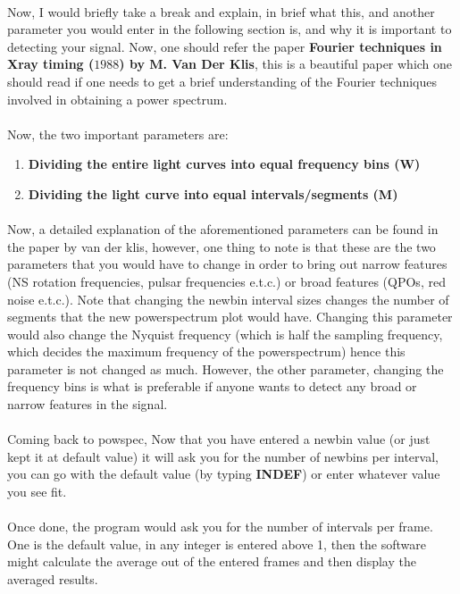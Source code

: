 \documentclass[a4paper,twoside]{report}
\numberwithin{equation}{section}
\begin{document}
\paragraph{}
Now, I would briefly take a break and explain, in brief what this, and another parameter you would enter in the following section is, and why it is important to detecting your signal. Now, one should refer the paper \textbf{Fourier techniques in Xray timing ($1988$) by M. Van Der Klis}, this is a beautiful paper which one should read if one needs to get a brief understanding of the Fourier techniques involved in obtaining a  power spectrum. 
\paragraph{}
Now, the two important parameters are:
\begin{enumerate}
\item \textbf{Dividing the entire light curves into equal frequency bins (W)}
\item \textbf{Dividing the light curve into equal intervals/segments (M)}
\end{enumerate}
\paragraph{}
Now, a detailed explanation of the aforementioned parameters can be found in the paper by van der klis, however, one thing to note is that these are the two parameters that you would have to change in order to bring out narrow features (NS rotation frequencies, pulsar frequencies e.t.c.) or broad features (QPOs, red noise e.t.c.). Note that changing the newbin interval sizes changes the number of segments that the new powerspectrum plot would have. Changing this parameter would also change the Nyquist frequency (which is half the sampling frequency, which decides the maximum frequency of the powerspectrum) hence this parameter is not changed as much. However, the other parameter, changing the frequency bins is what is preferable if anyone wants to detect any broad or narrow features in the signal.
\paragraph{}
Coming back to powspec, Now that you have entered a newbin value (or just kept it at default value) it will ask you for the number of newbins per interval, you can go with the default value (by typing \textbf{INDEF}) or enter whatever value you see fit. 
\paragraph{}
Once done, the program would ask you for the number of intervals per frame. One is the default value, in any integer is entered above 1, then the software might calculate the average out of the entered frames and then display the averaged results. 
\end{document}
